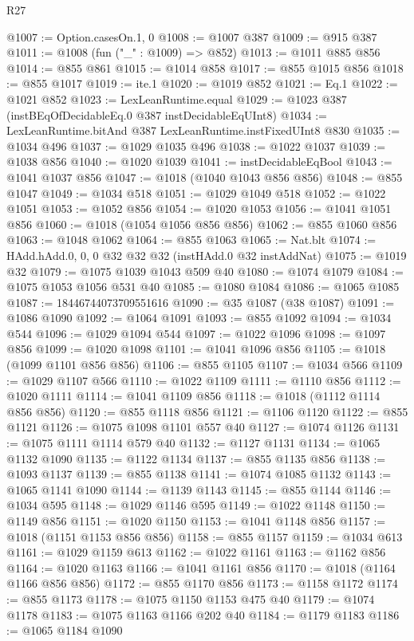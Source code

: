 \begin{lexlean}{R27}
\begin{coremodule}
@1007 := Option.casesOn.{1, 0}
@1008 := @1007 @387
@1009 := @915 @387
@1011 := @1008 (fun ("_" : @1009) => @852)
@1013 := @1011 @885 @856
@1014 := @855 @861
@1015 := @1014 @858
@1017 := @855 @1015 @856
@1018 := @855 @1017
@1019 := ite.{1}
@1020 := @1019 @852
@1021 := Eq.{1}
@1022 := @1021 @852
@1023 := LexLeanRuntime.equal
@1029 := @1023 @387 (instBEqOfDecidableEq.{0} @387 instDecidableEqUInt8)
@1034 := LexLeanRuntime.bitAnd @387 LexLeanRuntime.instFixedUInt8 @830
@1035 := @1034 @496
@1037 := @1029 @1035 @496
@1038 := @1022 @1037
@1039 := @1038 @856
@1040 := @1020 @1039
@1041 := instDecidableEqBool
@1043 := @1041 @1037 @856
@1047 := @1018 (@1040 @1043 @856 @856)
@1048 := @855 @1047
@1049 := @1034 @518
@1051 := @1029 @1049 @518
@1052 := @1022 @1051
@1053 := @1052 @856
@1054 := @1020 @1053
@1056 := @1041 @1051 @856
@1060 := @1018 (@1054 @1056 @856 @856)
@1062 := @855 @1060 @856
@1063 := @1048 @1062
@1064 := @855 @1063
@1065 := Nat.blt
@1074 := HAdd.hAdd.{0, 0, 0} @32 @32 @32 (instHAdd.{0} @32 instAddNat)
@1075 := @1019 @32
@1079 := @1075 @1039 @1043 @509 @40
@1080 := @1074 @1079
@1084 := @1075 @1053 @1056 @531 @40
@1085 := @1080 @1084
@1086 := @1065 @1085
@1087 := 18446744073709551616
@1090 := @35 @1087 (@38 @1087)
@1091 := @1086 @1090
@1092 := @1064 @1091
@1093 := @855 @1092
@1094 := @1034 @544
@1096 := @1029 @1094 @544
@1097 := @1022 @1096
@1098 := @1097 @856
@1099 := @1020 @1098
@1101 := @1041 @1096 @856
@1105 := @1018 (@1099 @1101 @856 @856)
@1106 := @855 @1105
@1107 := @1034 @566
@1109 := @1029 @1107 @566
@1110 := @1022 @1109
@1111 := @1110 @856
@1112 := @1020 @1111
@1114 := @1041 @1109 @856
@1118 := @1018 (@1112 @1114 @856 @856)
@1120 := @855 @1118 @856
@1121 := @1106 @1120
@1122 := @855 @1121
@1126 := @1075 @1098 @1101 @557 @40
@1127 := @1074 @1126
@1131 := @1075 @1111 @1114 @579 @40
@1132 := @1127 @1131
@1134 := @1065 @1132 @1090
@1135 := @1122 @1134
@1137 := @855 @1135 @856
@1138 := @1093 @1137
@1139 := @855 @1138
@1141 := @1074 @1085 @1132
@1143 := @1065 @1141 @1090
@1144 := @1139 @1143
@1145 := @855 @1144
@1146 := @1034 @595
@1148 := @1029 @1146 @595
@1149 := @1022 @1148
@1150 := @1149 @856
@1151 := @1020 @1150
@1153 := @1041 @1148 @856
@1157 := @1018 (@1151 @1153 @856 @856)
@1158 := @855 @1157
@1159 := @1034 @613
@1161 := @1029 @1159 @613
@1162 := @1022 @1161
@1163 := @1162 @856
@1164 := @1020 @1163
@1166 := @1041 @1161 @856
@1170 := @1018 (@1164 @1166 @856 @856)
@1172 := @855 @1170 @856
@1173 := @1158 @1172
@1174 := @855 @1173
@1178 := @1075 @1150 @1153 @475 @40
@1179 := @1074 @1178
@1183 := @1075 @1163 @1166 @202 @40
@1184 := @1179 @1183
@1186 := @1065 @1184 @1090

\end{coremodule}
\end{lexlean}
